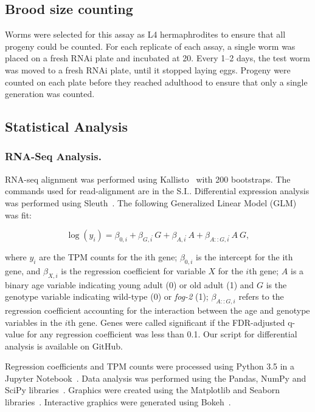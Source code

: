 \documentclass[9pt,twocolumn,twoside]{gsag3jnl}
\newcommand{\fog}{\emph{fog-2}}
\begin{document}
\subsection{Brood size counting}
\label{sb:brood_size}
Worms were selected for this assay as L4 hermaphrodites to ensure that all progeny could be counted. For each replicate of each assay, a single worm was placed on a fresh RNAi plate and incubated at 20\degree. Every 1--2 days, the test worm was moved to a fresh RNAi plate, until it stopped laying eggs. Progeny were counted on each plate before they reached adulthood to ensure that only a single generation was counted.

\subsection{Statistical Analysis}
\label{sb:statistics}
\subsubsection{RNA-Seq Analysis.}
RNA-seq alignment was performed using Kallisto~\citep{Bray2015} with 200 bootstraps. The commands used for read-alignment are in the S.I.. Differential expression analysis was performed using Sleuth~\citep{Pimentel2016}. The following Generalized Linear Model (GLM) was fit:

\begin{equation}
  \log(y_i) = \beta_{0,i} + \beta_{G,i}\dot~G + \beta_{A,i}\dot~A + \beta_{A::G,i}\dot~A~G,
  \label{eqn:GLM}
\end{equation}

where $y_i$ are the TPM counts for the ith gene; $\beta_{0,i}$ is the intercept for the ith gene, and $\beta_{X,i}$ is the regression coefficient for variable $X$ for the $i$th gene; $A$ is a binary age variable indicating young adult (0) or old adult (1) and $G$ is the genotype variable indicating wild-type (0) or \fog{} (1); $\beta_{A::G, i}$ refers to the regression coefficient accounting for the interaction between the age and genotype variables in the $i$th gene. Genes were called significant if the FDR-adjusted q-value for any regression coefficient was less than 0.1. Our script for differential analysis is available on GitHub.

Regression coefficients and TPM counts were processed using Python 3.5 in a Jupyter Notebook~\citep{Perez2007}. Data analysis was performed using the Pandas, NumPy and SciPy libraries~\citep{McKinney2011,VanDerWalt2011,Oliphant2007}. Graphics were created using the Matplotlib and Seaborn libraries~\citep{Waskom,Hunter2007}. Interactive graphics were generated using Bokeh~\citep{Team2014}.
\end{document}
